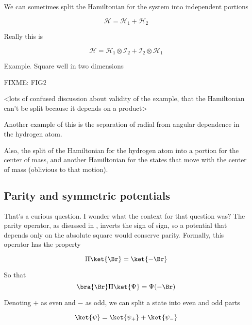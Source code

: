We can sometimes split the Hamiltonian for the system into independent portions

\begin{equation}\label{eqn:qmTwoR1:50}
\mathcal{H} = \mathcal{H}_1 + \mathcal{H}_2
\end{equation}

Really this is

\begin{equation}\label{eqn:qmTwoR1:70}
\mathcal{H} = 
\mathcal{H}_1 \otimes \mathcal{I}_2 
+\mathcal{I}_2 \otimes \mathcal{H}_1 
\end{equation}

Example.  Square well in two dimensions

FIXME: FIG2

<lots of confused discussion about validity of the example, that the Hamiltonian can't be split because it depends on a product>

Another example of this is the separation of radial from angular dependence in the hydrogen atom.

Also, the split of the Hamiltonian for the hydrogen atom into a portion for the center of mass, and another Hamiltonian for the states that move with the center of mass (oblivious to that motion).

\subsection{Parity and symmetric potentials}

That's a curious question.  I wonder what the context for that question was?  The parity operator, as disussed in \cite{wiki:parity}, inverts the sign of sign, so a potential that depends only on the absolute square would conserve parity.  Formally, this operator has the property

\begin{equation}\label{eqn:qmTwoR1:90}
\Pi \ket{\Br} = \ket{-\Br}
\end{equation}

So that
\begin{equation}\label{eqn:qmTwoR1:110}
\bra{\Br} \Pi \ket{\Psi} = \Psi(-\Br)
\end{equation}

Denoting $+$ as even and $-$ as odd, we can split a state into even and odd parts

\begin{equation}\label{eqn:qmTwoR1:130}
\ket{\psi} =
\ket{\psi_{+}}
+\ket{\psi_{-}}
\end{equation}

